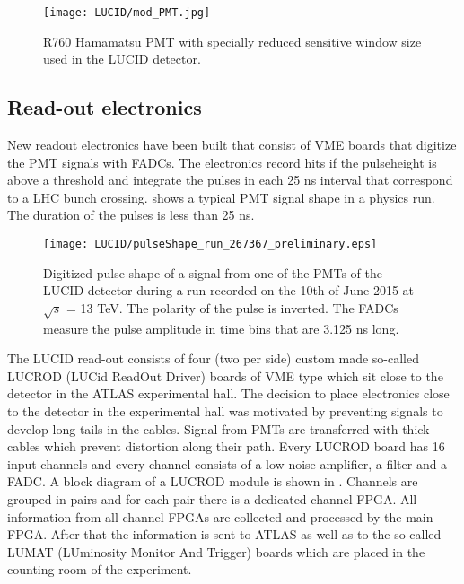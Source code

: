 
\begin{figure}
\centering
\texttt{[image: LUCID/mod\_PMT.jpg]}
\caption{R760 Hamamatsu PMT with specially reduced sensitive window size used in the LUCID detector.}
\label{fig:modPMT}
\end{figure}

\subsection{Read-out electronics}
\label{subsec:LUCIDElectronics}

New readout electronics have been built that consist of VME boards that digitize the PMT signals with FADCs. 
The electronics record hits if the pulseheight is above a threshold and integrate the pulses in each 25 ns 
interval that correspond to a LHC bunch crossing.  shows a typical PMT signal shape in 
a physics run. The duration of the pulses is less than 25 ns.

\begin{figure}
\centering
\texttt{[image: LUCID/pulseShape\_run\_267367\_preliminary.eps]}
\caption{Digitized pulse shape of a signal from one of the PMTs of the LUCID detector during a run recorded on 
the 10th of June 2015 at $\sqrt{s}$ = 13 TeV. The polarity of the pulse is inverted. The FADCs measure the 
pulse amplitude in time bins that are 3.125 ns long.}
\label{fig:pulseShape}
\end{figure}

The LUCID read-out consists of four (two per side) custom made so-called LUCROD (LUCid ReadOut Driver) boards of VME type which sit close to the detector in the ATLAS experimental hall.
The decision to place electronics close to the detector in the experimental hall was motivated by preventing signals to develop long tails in the cables.
Signal from PMTs are transferred with thick cables which prevent distortion along their path.
Every LUCROD board has 16 input channels and every channel consists of a low noise amplifier, a filter and a FADC.
A block diagram of a LUCROD module is shown in .
Channels are grouped in pairs and for each pair there is a dedicated channel FPGA.
All information from all channel FPGAs are collected and processed by the main FPGA.
After that the information is sent to ATLAS as well as to the so-called LUMAT (LUminosity Monitor And Trigger) boards 
which are placed in the counting room of the experiment.

